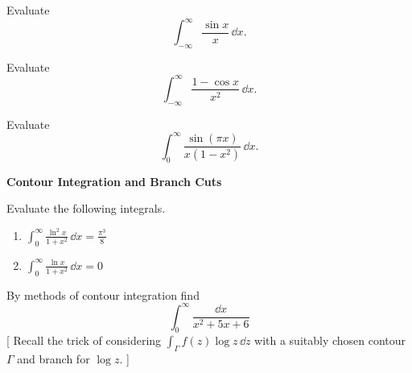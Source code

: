 {%
\begin{Exercise}
  \label{exercise sin(x)/x}
  Evaluate
  \[
  \int_{-\infty}^\infty \frac{\sin x}{x} \,\dd x.
  \]

\end{Exercise}



\begin{Exercise}
  \label{exercise (1-cos x)/x^2}
  Evaluate
  \[
  \int_{-\infty}^\infty \frac{1 - \cos x}{x^2} \,\dd x.
  \]

\end{Exercise}



\begin{Exercise}
  \label{exercise sin(pi x)/(x(1-x^2))}
  Evaluate
  \[
  \int_0^\infty \frac{\sin(\pi x)}{x(1-x^2)} \,\dd x.
  \]

\end{Exercise}



\begin{large}
  \noindent
  \textbf{Contour Integration and Branch Cuts}
\end{large}







\begin{Exercise}
  \label{exercise int (ln x)^2 / (1 + x^2)}
  Evaluate the following integrals.
  \begin{enumerate}
  \item
    $\displaystyle \int_0^\infty \frac{\ln^2 x}{1 + x^2}\,\dd x = \frac{\pi^3}{8}$
  \item
    $\displaystyle \int_0^\infty \frac{\ln x}{1 + x^2}\,\dd x = 0$
  \end{enumerate}

\end{Exercise}









\begin{Exercise}
  \label{exercise 1/(x^2+5x+6)}
  By methods of contour integration find
  \[
  \int_0^\infty \frac{\dd x}{ x^2 + 5 x + 6 }
  \]
  [ Recall the trick of considering $\int_\Gamma f(z) \log z \,\dd z$ with
  a suitably chosen contour $\Gamma$ and branch for $\log z$. ]


\end{Exercise}}
